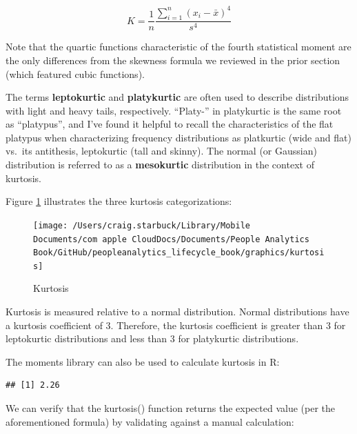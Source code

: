 \documentclass[]{book}
\newenvironment{Shaded}{\begin{snugshade}}{\end{snugshade}}
\newcommand{\CommentTok}[1]{\textcolor[rgb]{0.56,0.35,0.01}{\textit{#1}}}
\newcommand{\DecValTok}[1]{\textcolor[rgb]{0.00,0.00,0.81}{#1}}
\newcommand{\KeywordTok}[1]{\textcolor[rgb]{0.13,0.29,0.53}{\textbf{#1}}}
\newcommand{\NormalTok}[1]{#1}
\newcommand{\OperatorTok}[1]{\textcolor[rgb]{0.81,0.36,0.00}{\textbf{#1}}}
\begin{document}
\[ K = \frac{1}{n} \frac{\displaystyle\sum_{i=1}^{n} (x_i-\bar{x})^4}{s^4} \]

Note that the quartic functions characteristic of the fourth statistical moment are the only differences from the skewness formula we reviewed in the prior section (which featured cubic functions).

The terms \textbf{leptokurtic} and \textbf{platykurtic} are often used to describe distributions with light and heavy tails, respectively. ``Platy-'' in platykurtic is the same root as ``platypus'', and I've found it helpful to recall the characteristics of the flat platypus when characterizing frequency distributions as platkurtic (wide and flat) vs.~its antithesis, leptokurtic (tall and skinny). The normal (or Gaussian) distribution is referred to as a \textbf{mesokurtic} distribution in the context of kurtosis.

Figure \ref{fig:kurtosis} illustrates the three kurtosis categorizations:

\begin{figure}

{\centering \texttt{[image: /Users/craig.starbuck/Library/Mobile Documents/com~apple~CloudDocs/Documents/People Analytics Book/GitHub/peopleanalytics\_lifecycle\_book/graphics/kurtosis]} 

}

\caption{Kurtosis}\label{fig:kurtosis}
\end{figure}

Kurtosis is measured relative to a normal distribution. Normal distributions have a kurtosis coefficient of 3. Therefore, the kurtosis coefficient is greater than 3 for leptokurtic distributions and less than 3 for platykurtic distributions.

The moments library can also be used to calculate kurtosis in R:

\begin{Shaded}
\end{Shaded}

\begin{verbatim}
## [1] 2.26
\end{verbatim}

We can verify that the kurtosis() function returns the expected value (per the aforementioned formula) by validating against a manual calculation:
\end{document}
